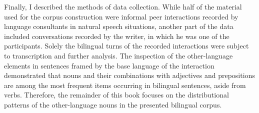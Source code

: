 Finally, I described the methods of data collection. While half of the material used for the corpus construction were informal peer interactions recorded by language consultants in natural speech situations, another part of the data included conversations recorded by the writer, in which he was one of the participants. Solely the bilingual turns of the recorded interactions were subject to transcription and further analysis. The inspection of the other-language elements in sentences framed by the base language of the interaction demonstrated that nouns and their combinations with adjectives and prepositions are among the most frequent items occurring in bilingual sentences, aside from verbs. Therefore, the remainder of this book focuses on the distributional patterns of the other-language nouns in the presented bilingual corpus.